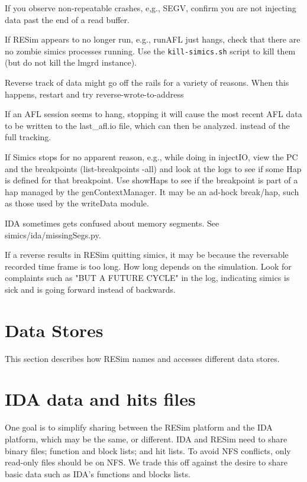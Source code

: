\documentclass[titlepage]{article}
\begin{document}
If you observe non-repeatable crashes, e,g., SEGV, confirm you are not injecting data past the end of a read buffer.

If RESim appears to no longer run, e.g., runAFL just hangs, check that there are no zombie simics processes running.  Use
the {\tt kill-simics.sh} script to kill them (but do not kill the lmgrd instance).

Reverse track of data might go off the rails for a variety of reasons.  When this happens, restart and try reverse-wrote-to-address

If an AFL session seems to hang, stopping it will cause the most recent AFL data to be written to the last\_afl.io file, which can then
be analyzed.
instead of the full tracking.

If Simics stops for no apparent reason, e.g., while doing in injectIO, view the PC and the breakpoints (list-breakpoints -all)
and look at the logs to see if some Hap is defined for that breakpoint.  Use showHaps to see if the breakpoint is part of a hap
managed by the genContextManager.  It may be an ad-hock break/hap, such as those used by the writeData module.

IDA sometimes gets confused about memory segments.  See simics/ida/missingSegs.py.

If a reverse results in RESim quitting simics, it may be because the reversable recorded time frame is too long.  How long depends
on the simulation.  Look for complaints such as "BUT A FUTURE CYCLE" in the log, indicating simics is sick and is going forward
instead of backwards.

\section{Data Stores}
\label{data-stores}
This section describes how RESim names and accesses different data stores.

\section{IDA data and hits files}
One goal is to simplify sharing between the RESim platform and the IDA platform,
which may be the same, or different.  IDA and RESim need to share binary files; function and block lists; and hit lists.
To avoid NFS conflicts, only read-only files should be on NFS. We trade this off against
the desire to share basic data such as IDA's functions and blocks lists.  
\end{document}
